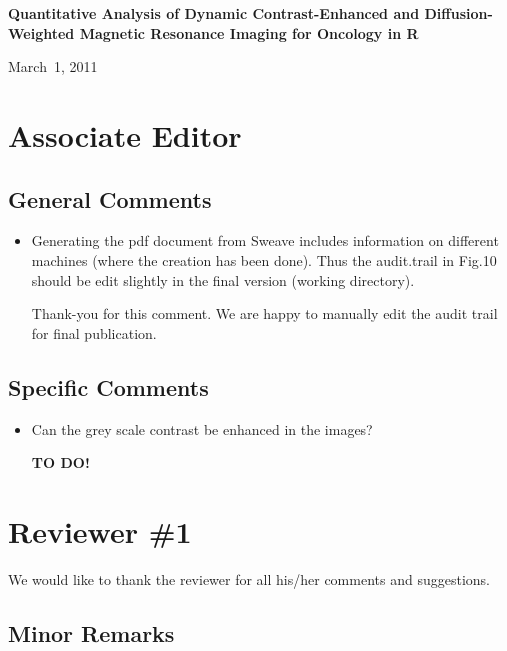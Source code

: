 \documentclass[11pt]{article}
\begin{document}

\begin{center}
{\Large \textbf{Quantitative Analysis of Dynamic Contrast-Enhanced and Diffusion-Weighted Magnetic Resonance Imaging for Oncology in \textsf{R}}}

\bigskip

March~1, 2011

\end{center}

\section*{Associate Editor}

\subsection*{General Comments}

\begin{itemize}

\item Generating the pdf document from Sweave includes information on
  different machines (where the creation has been done).  Thus the
  audit.trail in Fig.10 should be edit slightly in the final version
  (working directory).

  Thank-you for this comment.  We are happy to manually edit the audit
  trail for final publication.

\end{itemize}

\subsection*{Specific Comments}

\begin{itemize}

\item Can the grey scale contrast be enhanced in the images?

  \textbf{TO DO!}

\end{itemize}

\section*{Reviewer \#1}

We would like to thank the reviewer for all his/her comments and
suggestions.

\subsection*{Minor Remarks}
\end{document}
